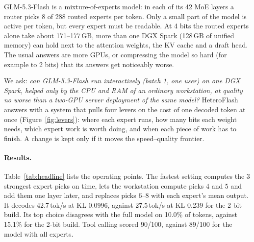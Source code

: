 \documentclass[11pt]{article}
\newcommand{\tps}{\,tok/s}
\begin{document}
GLM-5.3-Flash is a mixture-of-experts model: in each of its 42 MoE layers a router picks 8 of 288 routed experts per
token. Only a small part of the model is active per token, but every expert must be readable. At 4 bits the routed
experts alone take about 171--177\,GB, more than one DGX Spark (128\,GB of unified memory) can hold next to the attention
weights, the KV cache and a draft head. The usual answers are more GPUs, or compressing the model so hard (for example
to 2 bits) that its answers get noticeably worse.

We ask: \emph{can GLM-5.3-Flash run interactively (batch 1, one user) on one DGX Spark, helped only by the CPU and RAM of
an ordinary workstation, at quality no worse than a two-GPU server deployment of the same model?}
HeteroFlash answers with a system that pulls four levers on the cost of one decoded token at once
(Figure~\ref{fig:levers}): where each expert runs, how many bits each weight needs, which expert work is worth doing,
and when each piece of work has to finish. A change is kept only if it moves the speed--quality frontier.

\paragraph{Results.} Table~\ref{tab:headline} lists the operating points. The fastest setting computes the 3 strongest
expert picks on time, lets the workstation compute picks 4 and 5 and add them one layer later, and replaces picks 6--8
with each expert's mean output. It decodes 42.7\tps{} at KL 0.0996, against 27.5\tps{} at KL 0.239 for the 2-bit build.
Its top choice disagrees with the full model on 10.0\% of tokens, against 15.1\% for the 2-bit build. Tool calling scored
90/100, against 89/100 for the model with all experts.
\end{document}
